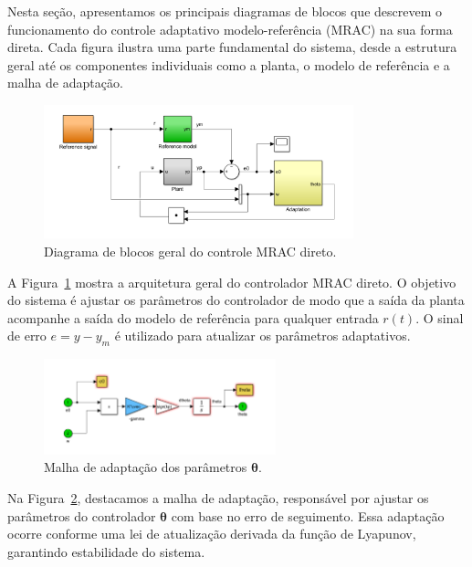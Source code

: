 \documentclass[10pt]{article}
\newcommand{\bm}[1]{\boldsymbol{#1}}
\begin{document}
Nesta seção, apresentamos os principais diagramas de blocos que descrevem o funcionamento do controle adaptativo modelo-referência (MRAC) na sua forma direta. Cada figura ilustra uma parte fundamental do sistema, desde a estrutura geral até os componentes individuais como a planta, o modelo de referência e a malha de adaptação.

\begin{figure}[h!]
  \centering
  \includegraphics[width=0.8\textwidth]{img/diagrama_mrac_direto.png}
  \caption{Diagrama de blocos geral do controle MRAC direto.}
  \label{fig:mrac_direto}
\end{figure}

A Figura~\ref{fig:mrac_direto} mostra a arquitetura geral do controlador MRAC direto. O objetivo do sistema é ajustar os parâmetros do controlador de modo que a saída da planta acompanhe a saída do modelo de referência para qualquer entrada $r(t)$. O sinal de erro $e = y - y_m$ é utilizado para atualizar os parâmetros adaptativos.

\begin{figure}[h!]
  \centering
  \includegraphics[width=0.6\textwidth]{img/diagrama_adaptacao.png}
  \caption{Malha de adaptação dos parâmetros $\bm{\theta}$.}
  \label{fig:adaptacao}
\end{figure}

Na Figura~\ref{fig:adaptacao}, destacamos a malha de adaptação, responsável por ajustar os parâmetros do controlador $\bm{\theta}$ com base no erro de seguimento. Essa adaptação ocorre conforme uma lei de atualização derivada da função de Lyapunov, garantindo estabilidade do sistema.
\end{document}
